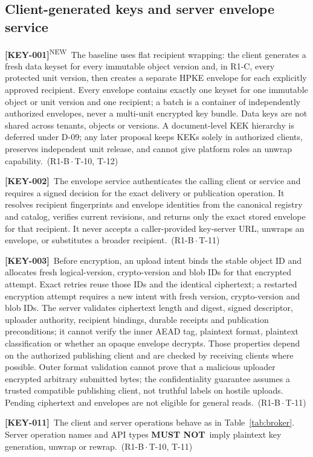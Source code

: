 \documentclass[11pt,a4paper]{article}
\newcommand{\mustnot}{\textbf{MUST NOT}}
\newcommand{\reqtag}[2]{{\footnotesize\color{accent}(#1\,$\cdot$\,#2)}}
\newcommand{\req}[4]{\par\noindent\hypertarget{req:#1}{\textbf{[#1]}}\ #4\ \reqtag{#2}{#3}\par}
\newcommand{\reqn}[4]{\par\noindent\hypertarget{req:#1}{\textbf{[#1]}}\textsuperscript{\color{accent}\tiny NEW}\ #4\ \reqtag{#2}{#3}\par}
\begin{document}
\subsection{Client-generated keys and server envelope service}
\reqn{KEY-001}{R1-B}{T-10, T-12}{The baseline uses flat recipient wrapping: the client generates a fresh data keyset for every immutable object version and, in R1-C, every protected unit version, then creates a separate HPKE envelope for each explicitly approved recipient. Every envelope contains exactly one keyset for one immutable object or unit version and one recipient; a batch is a container of independently authorized envelopes, never a multi-unit encrypted key bundle. Data keys are not shared across tenants, objects or versions. A document-level KEK hierarchy is deferred under D-09; any later proposal keeps KEKs solely in authorized clients, preserves independent unit release, and cannot give platform roles an unwrap capability.}
\req{KEY-002}{R1-B}{T-11}{The envelope service authenticates the calling client or service and requires a signed decision for the exact delivery or publication operation. It resolves recipient fingerprints and envelope identities from the canonical registry and catalog, verifies current revisions, and returns only the exact stored envelope for that recipient. It never accepts a caller-provided key-server URL, unwraps an envelope, or substitutes a broader recipient.}
\req{KEY-003}{R1-B}{T-11}{Before encryption, an upload intent binds the stable object ID and allocates fresh logical-version, crypto-version and blob IDs for that encrypted attempt. Exact retries reuse those IDs and the identical ciphertext; a restarted encryption attempt requires a new intent with fresh version, crypto-version and blob IDs. The server validates ciphertext length and digest, signed descriptor, uploader authority, recipient bindings, durable receipts and publication preconditions; it cannot verify the inner AEAD tag, plaintext format, plaintext classification or whether an opaque envelope decrypts. Those properties depend on the authorized publishing client and are checked by receiving clients where possible. Outer format validation cannot prove that a malicious uploader encrypted arbitrary submitted bytes; the confidentiality guarantee assumes a trusted compatible publishing client, not truthful labels on hostile uploads. Pending ciphertext and envelopes are not eligible for general reads.}
\req{KEY-011}{R1-B}{T-10, T-11}{The client and server operations behave as in Table~\ref{tab:broker}. Server operation names and API types \mustnot\ imply plaintext key generation, unwrap or rewrap.}
\end{document}
